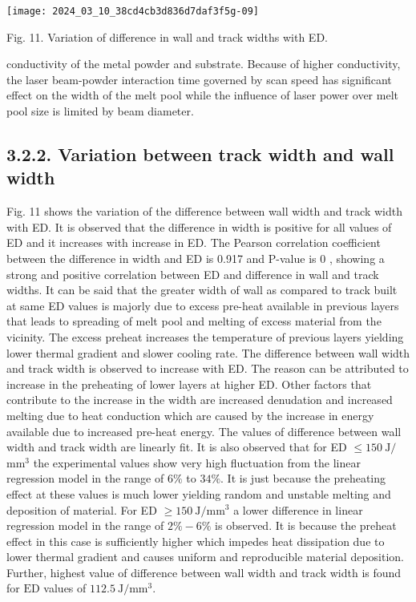 \documentclass[10pt]{article}
\begin{document}
\begin{center}
\texttt{[image: 2024\_03\_10\_38cd4cb3d836d7daf3f5g-09]}
\end{center}

Fig. 11. Variation of difference in wall and track widths with ED.

conductivity of the metal powder and substrate. Because of higher conductivity, the laser beam-powder interaction time governed by scan speed has significant effect on the width of the melt pool while the influence of laser power over melt pool size is limited by beam diameter.

\subsection*{3.2.2. Variation between track width and wall width}
Fig. 11 shows the variation of the difference between wall width and track width with ED. It is observed that the difference in width is positive for all values of ED and it increases with increase in ED. The Pearson correlation coefficient between the difference in width and ED is 0.917 and $\mathrm{P}$-value is 0 , showing a strong and positive correlation between ED and difference in wall and track widths. It can be said that the greater width of wall as compared to track built at same ED values is majorly due to excess pre-heat available in previous layers that leads to spreading of melt pool and melting of excess material from the vicinity. The excess preheat increases the temperature of previous layers yielding lower thermal gradient and slower cooling rate. The difference between wall width and track width is observed to increase with ED. The reason can be attributed to increase in the preheating of lower layers at higher ED. Other factors that contribute to the increase in the width are increased denudation and increased melting due to heat conduction which are caused by the increase in energy available due to increased pre-heat energy. The values of difference between wall width and track width are linearly fit. It is also observed that for ED $\leq 150 \mathrm{~J} /$ $\mathrm{mm}^{3}$ the experimental values show very high fluctuation from the linear regression model in the range of $6 \%$ to $34 \%$. It is just because the preheating effect at these values is much lower yielding random and unstable melting and deposition of material. For ED $\geq 150 \mathrm{~J} / \mathrm{mm}^{3}$ a lower difference in linear regression model in the range of $2 \%-6 \%$ is observed. It is because the preheat effect in this case is sufficiently higher which impedes heat dissipation due to lower thermal gradient and causes uniform and reproducible material deposition. Further, highest value of difference between wall width and track width is found for $\mathrm{ED}$ values of $112.5 \mathrm{~J} / \mathrm{mm}^{3}$.
\end{document}
